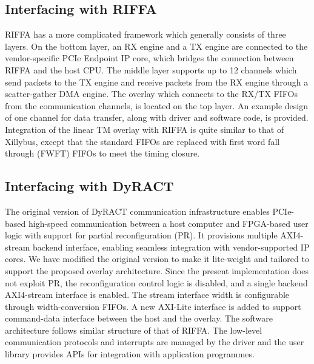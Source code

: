 \subsection{Interfacing with RIFFA}
RIFFA has a more complicated framework which generally consists of three layers. 
On the bottom layer, an RX engine and a TX engine are connected to the vendor-specific PCIe Endpoint IP core, which bridges the connection between RIFFA and the host CPU. 
The middle layer supports up to 12 channels which send packets to the TX engine and receive packets from the RX engine through a scatter-gather DMA engine. 
The overlay which connects to the RX/TX FIFOs from the communication channels, is located on the top layer. 
An example design of one channel for data transfer, along with driver and software code, is provided. 
Integration of the linear TM overlay with RIFFA is quite similar to that of Xillybus, except that the standard FIFOs are replaced with first word fall through (FWFT) FIFOs to meet the timing closure. 



\subsection{Interfacing with DyRACT}
The original version of DyRACT communication infrastructure enables PCIe-based high-speed communication between a host computer and FPGA-based user logic with support for partial reconfiguration (PR). 
It provisions multiple AXI4-stream backend interface, enabling seamless integration with vendor-supported IP cores. 
We have modified the original version to make it lite-weight and tailored to support the proposed overlay architecture. 
Since the present implementation does not exploit PR, the reconfiguration control logic is disabled, and a single backend AXI4-stream interface is enabled. 
The stream interface width is configurable through width-conversion FIFOs. 
A new AXI-Lite interface is added to support command-data interface between the host and the overlay.
The software architecture follows similar structure of that of RIFFA. 
The low-level communication protocols and interrupts are managed by the driver and the user library provides APIs for integration with application programmes. 


